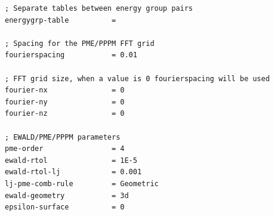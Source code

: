 \documentclass[12pt,twoside,a4paper]{report}
\begin{document}
\begin{appendices}
\begin{verbatim}
; Separate tables between energy group pairs
energygrp-table          = 

; Spacing for the PME/PPPM FFT grid
fourierspacing           = 0.01

; FFT grid size, when a value is 0 fourierspacing will be used
fourier-nx               = 0
fourier-ny               = 0
fourier-nz               = 0

; EWALD/PME/PPPM parameters
pme-order                = 4
ewald-rtol               = 1E-5
ewald-rtol-lj            = 0.001
lj-pme-comb-rule         = Geometric
ewald-geometry           = 3d
epsilon-surface          = 0

\end{verbatim}















\end{appendices}
\end{document}

